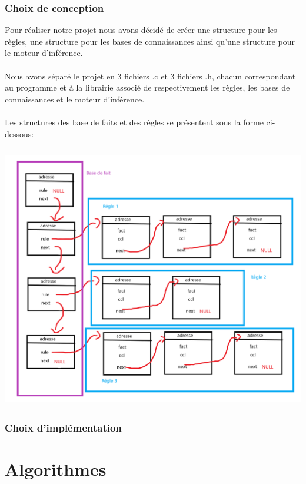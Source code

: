 \documentclass[12pt]{article}
\begin{document}
\section{Choix de conception}
Pour réaliser notre projet nous avons décidé de créer une structure pour les règles, une structure pour les bases de connaissances ainsi qu'une structure pour le moteur d'inférence.\\
\\
Nous avons séparé le projet en 3 fichiers .c et 3 fichiers .h, chacun correspondant au programme et à la librairie associé de respectivement les règles, les bases de connaissances et le moteur d'inférence.\\
\\
Les structures des base de faits et des règles se présentent sous la forme ci-dessous:\\
\\
\includegraphics[width=16cm,height=114mm]{Explication.png} 

\section{Choix d'implémentation}

\newpage

\part{Algorithmes}

\newpage
\end{document}
